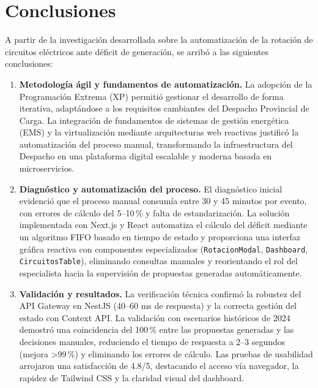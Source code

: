 \chapter*{Conclusiones}
{}

A partir de la investigación desarrollada sobre la automatización de la rotación de circuitos eléctricos ante déficit de generación, se arribó a las siguientes conclusiones:

\begin{enumerate}
    \item \textbf{Metodología ágil y fundamentos de automatización.} La adopción de la Programación Extrema (XP) permitió gestionar el desarrollo de forma iterativa, adaptándose a los requisitos cambiantes del Despacho Provincial de Carga. La integración de fundamentos de sistemas de gestión energética (EMS) y la virtualización mediante arquitecturas web reactivas justificó la automatización del proceso manual, transformando la infraestructura del Despacho en una plataforma digital escalable y moderna basada en microservicios.
    
    \item \textbf{Diagnóstico y automatización del proceso.} El diagnóstico inicial evidenció que el proceso manual consumía entre 30 y 45 minutos por evento, con errores de cálculo del 5–10\,\% y falta de estandarización. La solución implementada con Next.js y React automatiza el cálculo del déficit mediante un algoritmo FIFO basado en tiempo de estado y proporciona una interfaz gráfica reactiva con componentes especializados (\texttt{RotacionModal}, \texttt{Dashboard}, \texttt{CircuitosTable}), eliminando consultas manuales y reorientando el rol del especialista hacia la supervisión de propuestas generadas automáticamente.
    
    \item \textbf{Validación y resultados.} La verificación técnica confirmó la robustez del API Gateway en NestJS (40–60 ms de respuesta) y la correcta gestión del estado con Context API. La validación con escenarios históricos de 2024 demostró una coincidencia del 100\,\% entre las propuestas generadas y las decisiones manuales, reduciendo el tiempo de respuesta a 2–3 segundos (mejora >99\,\%) y eliminando los errores de cálculo. Las pruebas de usabilidad arrojaron una satisfacción de 4.8/5, destacando el acceso vía navegador, la rapidez de Tailwind CSS y la claridad visual del dashboard.
    

\end{enumerate}
